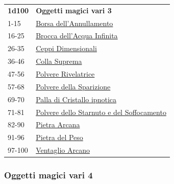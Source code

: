 \begin{multicols}{2}
{{\small\begin{tabularx}{0.45\textwidth}{lX}
\textbf{1d100} & \textbf{Oggetti magici vari 3}\\
1-15 & \hyperlink{Borsadell'Annullamento}{Borsa dell'Annullamento}\\
16-25 & \hyperlink{Broccadell'AcquaInfinita}{Brocca dell'Acqua Infinita}\\
26-35 & \hyperlink{CeppiDimensionali}{Ceppi Dimensionali}\\
36-46 & \hyperlink{CollaSuprema}{Colla Suprema}\\
47-56 & \hyperlink{PolvereRivelatrice}{Polvere Rivelatrice}\\
57-68 & \hyperlink{PolveredellaSparizione}{Polvere della Sparizione}\\
69-70 & \hyperlink{PalladiCristalloipnotica}{Palla di Cristallo ipnotica}\\
71-81 & \hyperlink{PolveredelloStarnutoedelSoffocamento}{Polvere dello Starnuto e del Soffocamento}\\
82-90 & \hyperlink{PietraArcana}{Pietra Arcana}\\
91-96 & \hyperlink{PietradelPeso}{Pietra del Peso}\\
97-100 & \hyperlink{VentaglioArcano}{Ventaglio Arcano}
\end{tabularx}}



\subsubsection{Oggetti magici vari 4}\hypertarget{Oggetti Magici Vari 4}{}

}
\end{multicols}
